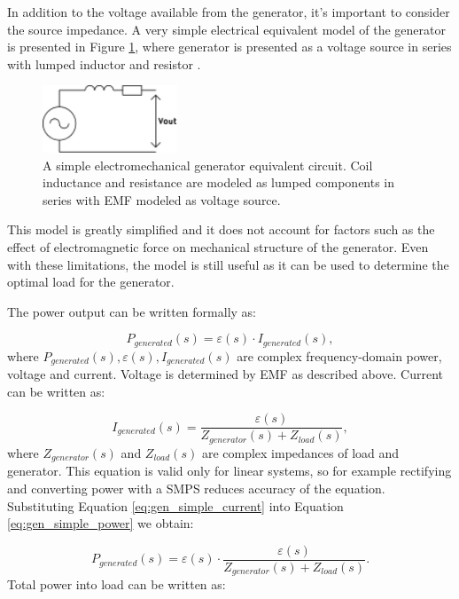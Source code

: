 In addition to the voltage available from the generator, it's important to consider the source impedance. A very simple electrical equivalent model of the generator is presented in Figure \ref{gen_simple}, where generator is presented as a voltage source in series with lumped inductor and resistor \cite{Jirutitijaroen2012}. 

\begin{figure}[htb]
\begin{center}
\includegraphics[height=2cm]{images/own_dwg/gen_simple}
\end{center}
\caption{A simple electromechanical generator equivalent circuit. Coil inductance and resistance are modeled as lumped components in series with EMF modeled as voltage source.}
\label{gen_simple}
\end{figure}

This model is greatly simplified and it does not account for factors such as the effect of electromagnetic force on mechanical structure of the generator. Even with these limitations, the model is still useful as it can be used to determine the optimal load for the generator. 

The power output can be written formally as:

\begin{equation} \label{eq:gen_simple_power}
  P_{generated}(s) = \varepsilon(s) \cdot I_{generated}(s),
\end{equation}
where $P_{generated}(s), \varepsilon(s), I_{generated}(s)$ are complex frequency-domain power, voltage and current. Voltage is determined by EMF as described above. Current can be written as: 

\begin{equation} \label{eq:gen_simple_current}
  I_{generated}(s) = \frac{\varepsilon(s)}{Z_{generator}(s)+Z_{load}(s)},
\end{equation}
where $Z_{generator}(s) $ and $ Z_{load}(s)$ are complex impedances of load and generator. This equation is valid only for linear systems, so for example rectifying and converting power with a SMPS reduces accuracy of the equation. Substituting Equation \eqref{eq:gen_simple_current} into Equation \eqref{eq:gen_simple_power} we obtain:

\begin{equation}
  P_{generated}(s) = \varepsilon(s) \cdot \frac{\varepsilon(s)}{Z_{generator}(s)+Z_{load}(s)}.
\end{equation}
Total power into load can be written as:

